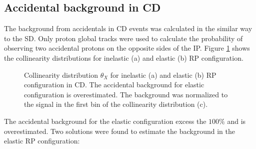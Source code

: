 \subsection{Accidental background in CD}
The background from accidentals in CD events was calculated in the similar way to the SD. Only proton global tracks were used to calculate the probability of observing two accidental protons on the opposite sides of the IP. Figure \ref{fig:CDcoll} shows the collinearity distributions for inelastic (a) and elastic (b) RP configuration. 
\begin{figure}[H]
	\centering
	\parbox{0.48\textwidth}{
		\centering
		\begin{subfigure}[b]{\linewidth}{
				}
		\end{subfigure}
	}
	\quad
	\parbox{0.48\textwidth}{
		\centering
		\begin{subfigure}[b]{\linewidth}{
				}
		\end{subfigure}
	}
	\parbox{0.48\textwidth}{
		\centering
		\begin{subfigure}[b]{\linewidth}{
				}
		\end{subfigure}
	}
	\caption[Collinearity distribution $\theta_X$ for inelastic and elastic RP configuration in CD]{Collinearity distribution $\theta_X$ for inelastic (a) and elastic (b) RP configuration in CD. The accidental background for elastic configuration is overestimated. The background was normalized to the signal in the first bin of the collinearity distribution (c).}
	\label{fig:CDcoll}
\end{figure}
The accidental background for the elastic configuration excess the $100\%$ and is overestimated. Two solutions were found to estimate the background in the elastic RP configuration:
